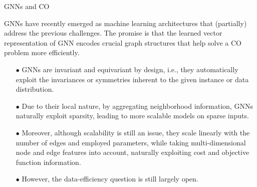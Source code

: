 \documentclass[10pt, aspectratio=169, compress, protectframetitle, handout]{beamer}
\begin{document}
\begin{frame}{GNNs and CO}

    \alert{GNNs} have recently emerged as machine learning architectures that (partially) address the previous challenges. The promise is that the learned vector representation of GNN encodes crucial graph structures that help solve a CO problem more efficiently.
    \begin{itemize}
        \item[\alert{$\bullet$}] GNNs are \alert{invariant and equivariant} by design, i.e., they automatically exploit the invariances or symmetries inherent to the given instance or data distribution.
        \item[\alert{$\bullet$}] Due to their local nature, by aggregating neighborhood information, GNNs naturally \alert{exploit sparsity}, leading to more scalable models on sparse inputs.
        \item[\alert{$\bullet$}] Moreover, although scalability is still an issue, they \alert{scale linearly} with the number of edges and employed parameters, while taking multi-dimensional node and edge features into account, naturally exploiting cost and objective function information.
        \item[\alert{$\bullet$}] However, the \alert{data-efficiency} question is still largely open.
    \end{itemize}
    
    
\end{frame}
    


    
    
\end{document}
